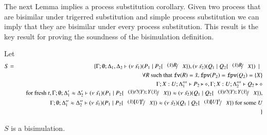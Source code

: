 \begin{comment}
	\noi {\bf Induction step:}

	\noi - Case: $Q \Par R \by{\bactout{s}{(x) P}} Q' \Par R$ and
	\[
		\Gamma; \emptyset; \Delta_1 \proves Q \Par R \hastype \Proc
	\]
	\noi Type rule $\trule{Par}$ implies
	\begin{eqnarray}
		\Gamma; \emptyset; \Delta_1' &\proves& Q \hastype \Proc\\
		\Gamma; \emptyset; \Delta_1'' &\proves& R \hastype \Proc \label{lem:aux3}
	\end{eqnarray}
	\noi From the induction hypothesis we get that 
	\begin{eqnarray*}
		\Gamma; \emptyset; \Delta_2' \proves Q' \Par P \hastype \Proc
	\end{eqnarray*}
	we apply rule $\trule{Par}$ to the latter judgement and judgement~\ref{lem:aux3} to get
	\begin{eqnarray*}
		\Gamma; \emptyset; \Delta_2' \cup \Delta'' \proves Q' \Par R \Par P \hastype \Proc
	\end{eqnarray*}

	The rest of the cases enjoy similar argumentation.
\end{proof}

\end{comment}


The next Lemma implies a process substitution corollary.
Given two process that are bisimilar under trigerred substitution
and simple process substitution we can imply that they are
bisimilar under every process substitution. This result is
the key result for proving the soundness of the bisimulation
definition.
 
\begin{lemma}\rm
	\label{lem:subst_equiv}
	Let 
	\begin{eqnarray*}
		S &=& \set{ \Gamma; \es; \Delta_1, \Delta_2 \proves \newsp{\tilde{s_1}}{P_1 \Par P_2 \subst{(\tilde{x}) R}{X}}, \newsp{\tilde{s_2}}{Q_1 \Par Q_2 \subst{(\tilde{x}) R}{X}} \setbar \\
		&& \quad \forall R \textrm{ such that } \fv{R} = \tilde{x}, \fpv{P_2} = \fpv{Q_2} = \set{X}\\
		&& \quad \Gamma; X: U; \Delta_1''' \proves P_2 \hastype \Proc, \Gamma; X: U; \Delta_2''' \proves Q_2 \hastype \Proc\\
		&& \quad \textrm{for fresh } t, \Gamma; \es; \Delta_1' \wb \Delta_2' \proves \newsp{\tilde{s_1}}{P_1 \Par P_2 \subst{(\tilde{x}) \binp{t}{Y} \appl{Y}{\tilde{x}}}{X}} \wb \newsp{\tilde{s_2}}{Q_1 \Par Q_2 \subst{(\tilde{x}) \binp{t}{Y} \appl{Y}{\tilde{x}}}{X}}, \\
		&& \quad \Gamma; \es; \Delta_1'' \wb \Delta_2'' \proves \newsp{\tilde{s_1}}{P_1 \Par P_2 \subst{(\tilde{x}) \map{U}^{\tilde{x}}}{X}} \wb \newsp{\tilde{s_2}}{Q_1 \Par Q_2 \subst{(\tilde{x}) \map{U}^{\tilde{x}}}{X}} \textrm{ for some } U \\
		&&}
	\end{eqnarray*}

	$S$ is a bisimulation.
\end{lemma}


